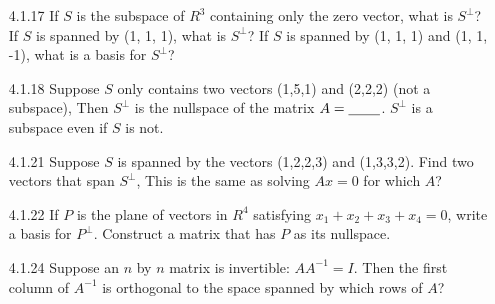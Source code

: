 \documentclass[10pt,twoside,reqno]{article}
\begin{document}
\begin{enumerate}
\vspace{3mm}
\item[4.1.17] If $S$ is the subspace of $R^3$ containing only the zero vector, what is $S^{\perp}$? If $S$ is spanned by (1, 1, 1), what is $S^{\perp}$? If $S$ is spanned by (1, 1, 1) and (1, 1, -1), what is a basis for $S^{\perp}$? \\ 
\vspace{3mm}

\vspace{3mm}
\item[4.1.18] Suppose $S$ only contains two vectors (1,5,1) and (2,2,2) (not a subspace), Then $S^{\perp}$ is the nullspace of the matrix $A =\underline{\hspace{8mm}}$. $S^{\perp}$ is a subspace even if $S$ is not. \\
\vspace{3mm}

\vspace{3mm}
\item[4.1.21] Suppose $S$ is spanned by the vectors (1,2,2,3) and (1,3,3,2). Find two vectors that span $S^{\perp}$, This is the same as solving $Ax = 0$ for which $A$? \\
\vspace{3mm}

\vspace{3mm}
\item[4.1.22] If $P$ is the plane of vectors in $R^4$ satisfying $x_1 + x_2 + x_3 + x_4 = 0$, write a basis for $P^{\perp}$. Construct a matrix that has $P$ as its nullspace.  \\
\vspace{3mm}

\vspace{3mm}
\item[4.1.24] Suppose an $n$ by $n$ matrix is invertible: $AA^{-1} = I$. Then the first column of $A^{-1}$ is orthogonal to the space spanned by which rows of $A$? \\
\vspace{3mm}


\end{enumerate}
\end{document}
